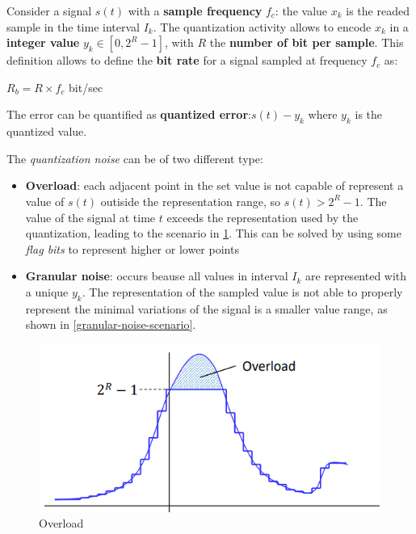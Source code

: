 \documentclass[10pt,a4paper]{report}
\theoremstyle{definition}
\begin{document}
Consider a signal $s(t)$ with a \textbf{sample frequency} $f_{c}$: the value $x_{k}$ is the readed sample in the time interval $I_{k}$.
The quantization activity allows to encode $x_{k}$ in a \textbf{integer value} $y_{k} \in [0, 2^{R}-1]$, with $R$ the \textbf{number of bit per sample}. This definition allows to define the \textbf{bit rate} for a signal sampled at frequency $f_{c}$ as:
\begin{center}
$R_{b} = R \times f_{c}$ bit/sec
\end{center}

The error can be quantified  as \textbf{quantized error}:$s(t)-y_{k}$ where $y_{k}$ is the quantized value.

The \textit{quantization noise} can be of two different type:
\begin{itemize}
	\item 
	\textbf{Overload}: each adjacent point in the set value is not capable of represent a value of $s(t)$ outiside the representation range, so $s(t) > 2^{R}-1$.  The value of the signal at time $t$ exceeds the representation used by the quantization, leading to the scenario in \ref{overload-scenario}. This can be solved by using some \textit{flag bits} to represent higher or lower points
	\item 
	\textbf{Granular noise}: occurs beause all values in interval $I_{k}$ are represented with a unique $y_{k}$. The representation of the sampled value is not able to properly represent the minimal variations of the signal is a smaller value range, as shown in \ref{granular-noise-scenario}.
\end{itemize}

\begin{figure}[h]
	\centering\includegraphics[scale=0.50]{images/Pasted image 20230526142358.png}
	\caption{Overload}
	\label{overload-scenario}
\end{figure}
\end{document}
